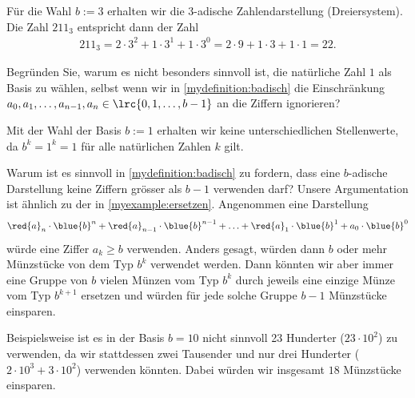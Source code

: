 \begin{myexample}
Für die Wahl $b:=3$ erhalten wir die $3$-adische Zahlendarstellung (Dreiersystem). Die Zahl $211_3$ entspricht dann der Zahl
\begin{align*}
	211_3 = 2\cdot 3^2 + 1\cdot 3^1 + 1\cdot 3^0 = 2\cdot 9 + 1\cdot 3 + 1\cdot 1 = 22.
\end{align*}
\end{myexample}

\begin{mychallenge}
	Begründen Sie, warum es nicht besonders sinnvoll ist, die natürliche Zahl $1$ als Basis zu wählen, selbst wenn wir in \cref{mydefinition:badisch} die Einschränkung $a_0, a_1, \ldots, a_{n-1}, a_{n}\in\lrc{0,1,\ldots,b-1}$ an die Ziffern ignorieren?
	\begin{myanswer}
		Mit der Wahl der Basis $b := 1$ erhalten wir keine unterschiedlichen Stellenwerte, da $b^k = 1^k = 1$ für alle natürlichen Zahlen $k$ gilt.
	\end{myanswer}
\end{mychallenge}

\begin{myremark}
	Warum ist es sinnvoll in \cref{mydefinition:badisch} zu fordern, dass eine $b$-adische Darstellung keine Ziffern grösser als $b-1$ verwenden darf?
	Unsere Argumentation ist ähnlich zu der in \cref{myexample:ersetzen}. Angenommen eine Darstellung
	\begin{align*}
		\red{a}_n\cdot \blue{b}^n + \red{a}_{n-1}\cdot \blue{b}^{n-1} + \ldots +\red{a}_1\cdot \blue{b}^1 + a_0\cdot
		\blue{b}^0
	\end{align*}
	würde eine Ziffer $a_k \geq b$ verwenden. Anders gesagt, würden dann $b$ oder mehr Münzstücke von dem Typ $b^k$ verwendet werden.
	Dann könnten wir aber immer eine Gruppe von $b$ vielen Münzen vom Typ $b^k$ durch jeweils eine einzige Münze vom Typ $b^{k+1}$ ersetzen und würden für jede solche Gruppe $b-1$ Münzstücke einsparen.

	Beispielsweise ist es in der Basis $b = 10$ nicht sinnvoll 23 Hunderter ($23\cdot 10^2$) zu verwenden, da wir stattdessen zwei Tausender und nur drei Hunderter ($2\cdot 10^3 + 3\cdot 10^2$) verwenden könnten.
	Dabei würden wir insgesamt $18$ Münzstücke einsparen.
\end{myremark}

